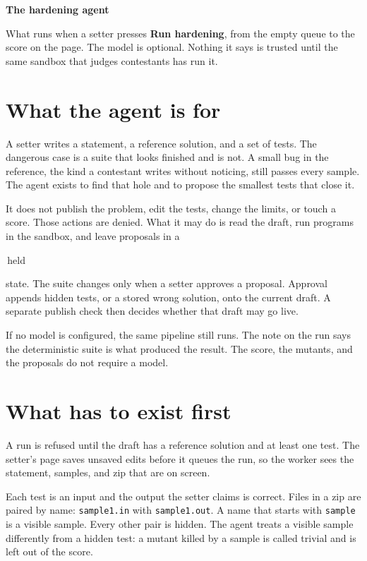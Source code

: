 \documentclass[10pt,a4paper]{article}
\newcommand{\chip}[1]{\colorbox{chip}{\small\strut\,#1\,}}
\newcommand{\meta}[1]{{\small #1}}
\begin{document}
{\LARGE\bfseries The hardening agent}\par
\vspace{0.15em}
\meta{What runs when a setter presses \textbf{Run hardening}, from the empty queue to the score on the page. The model is optional. Nothing it says is trusted until the same sandbox that judges contestants has run it.}

\vspace{0.45em}

\section{What the agent is for}

A setter writes a statement, a reference solution, and a set of tests. The dangerous case is a suite that looks finished and is not. A small bug in the reference, the kind a contestant writes without noticing, still passes every sample. The agent exists to find that hole and to propose the smallest tests that close it.

It does not publish the problem, edit the tests, change the limits, or touch a score. Those actions are denied. What it may do is read the draft, run programs in the sandbox, and leave proposals in a \chip{held} state. The suite changes only when a setter approves a proposal. Approval appends hidden tests, or a stored wrong solution, onto the current draft. A separate publish check then decides whether that draft may go live.

If no model is configured, the same pipeline still runs. The note on the run says the deterministic suite is what produced the result. The score, the mutants, and the proposals do not require a model.

\section{What has to exist first}

A run is refused until the draft has a reference solution and at least one test. The setter's page saves unsaved edits before it queues the run, so the worker sees the statement, samples, and zip that are on screen.

Each test is an input and the output the setter claims is correct. Files in a zip are paired by name: \texttt{sample1.in} with \texttt{sample1.out}. A name that starts with \texttt{sample} is a visible sample. Every other pair is hidden. The agent treats a visible sample differently from a hidden test: a mutant killed by a sample is called trivial and is left out of the score.
\end{document}
